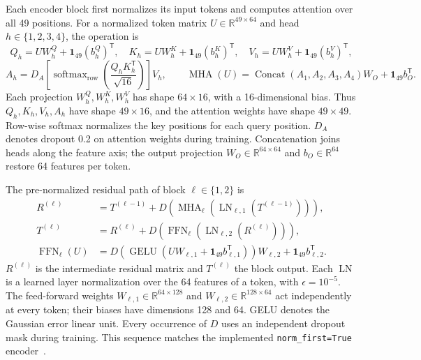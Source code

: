 Each encoder block first normalizes its input tokens and computes attention
over all 49 positions. For a normalized token matrix
$U\in\mathbb{R}^{49\times64}$ and head $h\in\{1,2,3,4\}$, the operation is
\begin{equation}
 Q_h=UW_h^Q+\mathbf{1}_{49}(b_h^Q)^{\mathsf T},\quad
 K_h=UW_h^K+\mathbf{1}_{49}(b_h^K)^{\mathsf T},\quad
 V_h=UW_h^V+\mathbf{1}_{49}(b_h^V)^{\mathsf T},
 \label{eq:meth_qkv}
\end{equation}
\begin{equation}
 A_h=D_A\!\left[\operatorname{softmax}_{\mathrm{row}}
       \left(\frac{Q_hK_h^{\mathsf T}}{\sqrt{16}}\right)\right]V_h,
 \qquad
 \operatorname{MHA}(U)=\operatorname{Concat}(A_1,A_2,A_3,A_4)W_O
                   +\mathbf{1}_{49}b_O^{\mathsf T}.
 \label{eq:meth_attention}
\end{equation}
Each projection $W_h^{Q},W_h^{K},W_h^{V}$ has shape $64\times16$,
with a 16-dimensional bias. Thus $Q_h,K_h,V_h,A_h$ have shape
$49\times16$, and the attention weights have shape $49\times49$.
Row-wise softmax normalizes the key positions for each query position.
$D_A$ denotes dropout 0.2 on attention weights during training.
Concatenation joins heads along the feature axis; the output projection
$W_O\in\mathbb{R}^{64\times64}$ and $b_O\in\mathbb{R}^{64}$ restore
64 features per token.

The pre-normalized residual path of block $\ell\in\{1,2\}$ is
\begin{equation}
 \begin{aligned}
 R^{(\ell)}&=T^{(\ell-1)}+
       D\!\left(\operatorname{MHA}_{\ell}
          (\operatorname{LN}_{\ell,1}(T^{(\ell-1)}))\right),\\
 T^{(\ell)}&=R^{(\ell)}+
       D\!\left(\operatorname{FFN}_{\ell}
          (\operatorname{LN}_{\ell,2}(R^{(\ell)}))\right),\\
 \operatorname{FFN}_{\ell}(U)&=
       D\!\left(\operatorname{GELU}(UW_{\ell,1}
                    +\mathbf{1}_{49}b_{\ell,1}^{\mathsf T})\right)
                    W_{\ell,2}+\mathbf{1}_{49}b_{\ell,2}^{\mathsf T}.
 \end{aligned}\label{eq:meth_block}
\end{equation}
$R^{(\ell)}$ is the intermediate residual matrix and $T^{(\ell)}$ the block
output. Each $\operatorname{LN}$ is a learned layer normalization over the
64 features of a token, with $\epsilon=10^{-5}$. The feed-forward weights
$W_{\ell,1}\in\mathbb{R}^{64\times128}$ and
$W_{\ell,2}\in\mathbb{R}^{128\times64}$ act independently at every token;
their biases have dimensions 128 and 64. GELU denotes the Gaussian error
linear unit. Every occurrence of $D$ uses an independent dropout mask during
training. This sequence matches the implemented
\texttt{norm\_first=True} encoder~\cite{meth_torch_encoder}.

